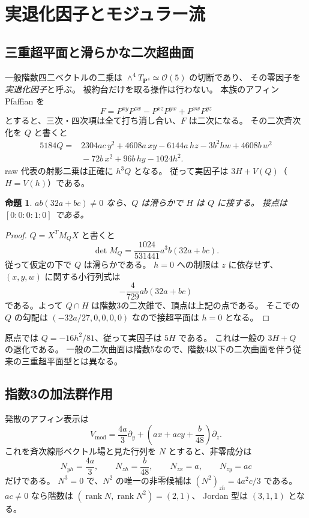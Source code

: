 \documentclass[11pt,a4paper]{ltjsarticle}
\newcommand{\PP}{\mathbf P}
\DeclareMathOperator{\rank}{rank}
\newtheorem{proposition}[theorem]{命題}
\theoremstyle{remark}
\begin{document}
\section{実退化因子とモジュラー流}

\subsection{三重超平面と滑らかな二次超曲面}

一般階数四二ベクトルの二乗は $\wedge^4T_{\PP^4}\simeq\mathcal O(5)$ の切断であり、
その零因子を\emph{実退化因子}と呼ぶ。
被約台だけを取る操作は行わない。
本族のアフィン Pfaffian を
\[
 F=P^{xy}P^{zw}-P^{xz}P^{yw}+P^{xw}P^{yz}
\]
とすると、三次・四次項は全て打ち消し合い、$F$ は二次になる。
その二次斉次化を $Q$ と書くと
\begin{equation}\label{eq:quadric}
\begin{aligned}
 5184Q={}&2304ac\,y^2+4608a\,xy-6144a\,hz
 -3b^2hw+4608b\,w^2\\
 &{}-72b\,x^2+96b\,hy-1024h^2.
\end{aligned}
\end{equation}
raw 代表の射影二乗は正確に $h^3Q$ となる。
従って実因子は $3H+V(Q)$（$H=V(h)$）である。

\begin{proposition}\label{prop:quadric}
$ab(32a+bc)\ne0$ なら、$Q$ は滑らかで $H$ は $Q$ に接する。
接点は $[0:0:0:1:0]$ である。
\end{proposition}
\begin{proof}
$Q=X^TM_QX$ と書くと
\begin{equation}\label{eq:qdet}
 \det M_Q=\frac{1024}{531441}a^3b(32a+bc).
\end{equation}
従って仮定の下で $Q$ は滑らかである。
$h=0$ への制限は $z$ に依存せず、$(x,y,w)$ に関する小行列式は
\[
 -\frac4{729}ab(32a+bc)
\]
である。よって $Q\cap H$ は階数3の二次錐で、頂点は上記の点である。
そこでの $Q$ の勾配は $(-32a/27,0,0,0,0)$ なので接超平面は $h=0$ となる。
\end{proof}

原点では $Q=-16h^2/81$、従って実因子は $5H$ である。
これは一般の $3H+Q$ の退化である。
一般の二次曲面は階数5なので、階数4以下の二次曲面を伴う従来の三重超平面型とは異なる。

\subsection{指数3の加法群作用}

発散のアフィン表示は
\begin{equation}\label{eq:modular}
 V_{\mathrm{mod}}=\frac{4a}{3}\partial_y+
             \left(ax+acy+\frac b{48}\right)\partial_z.
\end{equation}
これを斉次線形ベクトル場と見た行列を $N$ とすると、非零成分は
\begin{equation}\label{eq:N}
 N_{y h}=\frac{4a}3,\qquad N_{z h}=\frac b{48},\qquad
 N_{z x}=a,\qquad N_{z y}=ac
\end{equation}
だけである。
$N^3=0$ で、$N^2$ の唯一の非零候補は
$(N^2)_{z h}=4a^2c/3$ である。
$ac\ne0$ なら階数は $(\rank N,\rank N^2)=(2,1)$、
Jordan 型は $(3,1,1)$ となる。
\end{document}
